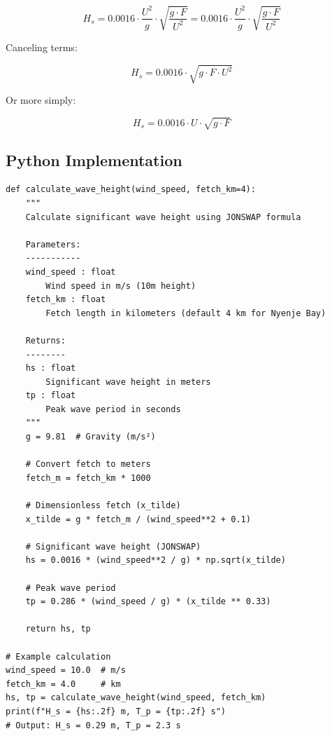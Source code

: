 \documentclass[12pt]{article}
\begin{document}
\begin{equation}
H_s = 0.0016 \cdot \frac{U^2}{g} \cdot \sqrt{\frac{g \cdot F}{U^2}} = 0.0016 \cdot \frac{U^2}{g} \cdot \sqrt{\frac{g \cdot F}{U^2}}
\end{equation}

Canceling terms:

\begin{equation}
\boxed{H_s = 0.0016 \cdot \sqrt{g \cdot F \cdot U^2}}
\end{equation}

Or more simply:

\begin{equation}
\boxed{H_s = 0.0016 \cdot U \cdot \sqrt{g \cdot F}}
\end{equation}

\subsection{Python Implementation}

\begin{lstlisting}[caption=JONSWAP Wave Height Calculation]
def calculate_wave_height(wind_speed, fetch_km=4):
    """
    Calculate significant wave height using JONSWAP formula
    
    Parameters:
    -----------
    wind_speed : float
        Wind speed in m/s (10m height)
    fetch_km : float
        Fetch length in kilometers (default 4 km for Nyenje Bay)
    
    Returns:
    --------
    hs : float
        Significant wave height in meters
    tp : float
        Peak wave period in seconds
    """
    g = 9.81  # Gravity (m/s²)
    
    # Convert fetch to meters
    fetch_m = fetch_km * 1000
    
    # Dimensionless fetch (x_tilde)
    x_tilde = g * fetch_m / (wind_speed**2 + 0.1)
    
    # Significant wave height (JONSWAP)
    hs = 0.0016 * (wind_speed**2 / g) * np.sqrt(x_tilde)
    
    # Peak wave period
    tp = 0.286 * (wind_speed / g) * (x_tilde ** 0.33)
    
    return hs, tp

# Example calculation
wind_speed = 10.0  # m/s
fetch_km = 4.0     # km
hs, tp = calculate_wave_height(wind_speed, fetch_km)
print(f"H_s = {hs:.2f} m, T_p = {tp:.2f} s")
# Output: H_s = 0.29 m, T_p = 2.3 s
\end{lstlisting}
\end{document}
